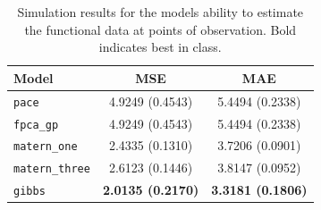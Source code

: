 \begin{table}[b]
	\caption[Simulation results for Scenario D on test data]{Simulation results for the models ability to estimate the functional data at points of observation. Bold indicates best in class.}
	\centering
	\label{tab:test_D}
	\begin{tabular}{lcc}
		\toprule
		\textbf{Model} & \textbf{MSE} & \textbf{MAE} \\
		\midrule
		\verb*|pace| & 4.9249 (0.4543)& 5.4494 (0.2338)\\
		\verb*|fpca_gp| & 4.9249 (0.4543)& 5.4494 (0.2338)\\
		\verb*|matern_one| & 2.4335	(0.1310) & 3.7206 (0.0901) \\
		\verb*|matern_three| & 2.6123 (0.1446)& 3.8147 (0.0952) \\
		\verb*|gibbs| & \textbf{2.0135 (0.2170)} & \textbf{3.3181 (0.1806)}\\
		\bottomrule
	\end{tabular}
\end{table}

